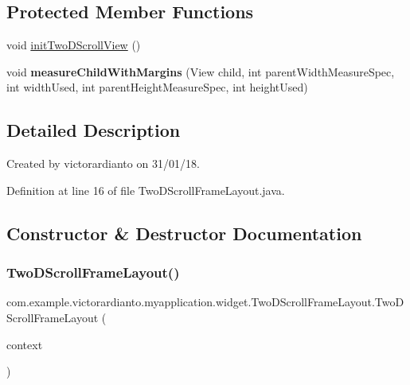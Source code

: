 \subsection*{Protected Member Functions}
\begin{DoxyCompactItemize}
\item 
void \mbox{\hyperlink{classcom_1_1example_1_1victorardianto_1_1myapplication_1_1widget_1_1_two_d_scroll_frame_layout_a88d422887ecec9da3f0999127b499004}{init\+Two\+D\+Scroll\+View}} ()
\item 
\mbox{\label{classcom_1_1example_1_1victorardianto_1_1myapplication_1_1widget_1_1_two_d_scroll_frame_layout_a1b2998b3884b56aebca5fd2c90bb206c}} 
void {\bfseries measure\+Child\+With\+Margins} (View child, int parent\+Width\+Measure\+Spec, int width\+Used, int parent\+Height\+Measure\+Spec, int height\+Used)
\end{DoxyCompactItemize}


\subsection{Detailed Description}
Created by victorardianto on 31/01/18. 

Definition at line 16 of file Two\+D\+Scroll\+Frame\+Layout.\+java.



\subsection{Constructor \& Destructor Documentation}
\mbox{\label{classcom_1_1example_1_1victorardianto_1_1myapplication_1_1widget_1_1_two_d_scroll_frame_layout_a7203f0c9e2344b39fbbd36f169ebeca7}} 
\subsubsection{\texorpdfstring{Two\+D\+Scroll\+Frame\+Layout()}{TwoDScrollFrameLayout()}\hspace{0.1cm}{\footnotesize\ttfamily [1/3]}}
{\footnotesize\ttfamily com.\+example.\+victorardianto.\+myapplication.\+widget.\+Two\+D\+Scroll\+Frame\+Layout.\+Two\+D\+Scroll\+Frame\+Layout (\begin{DoxyParamCaption}\item[{@Non\+Null Context}]{context }\end{DoxyParamCaption})\hspace{0.3cm}{\ttfamily [inline]}}

